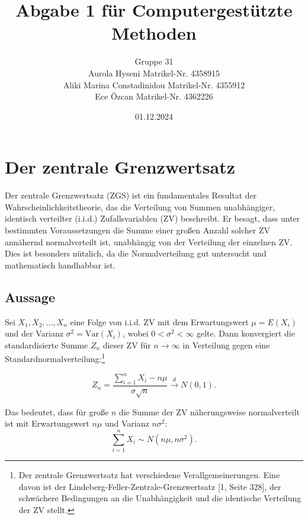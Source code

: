 \documentclass[a4paper,12pt]{article}
\begin{document}
\title{Abgabe 1 für Computergestützte Methoden}
\author{Gruppe 31\\ Aurola Hyseni  Matrikel-Nr. 4358915\\Aliki Marina Constadinidou  Matrikel-Nr. 4355912\\Ece Özcan  Matrikel-Nr. 4362226}
\date{01.12.2024}

\maketitle
\thispagestyle{empty}

\newpage
\thispagestyle{empty}
\tableofcontents



\newpage
\section{Der zentrale Grenzwertsatz}

Der zentrale Grenzwertsatz (ZGS) ist ein fundamentales Resultat der Wahrscheinlichkeitstheorie, das die Verteilung von Summen unabhängiger, identisch verteilter (i.i.d.) Zufallsvariablen (ZV) beschreibt. Er besagt, dass unter bestimmten Voraussetzungen die Summe einer großen Anzahl solcher ZV annähernd normalverteilt ist, unabhängig von der Verteilung der einzelnen ZV. Dies ist besonders nützlich, da die Normalverteilung gut untersucht und mathematisch handhabbar ist.

\subsection{Aussage}
Sei $X_1, X_2, \ldots, X_n$ eine Folge von i.i.d. ZV mit dem Erwartungswert $\mu = E(X_i)$ und der Varianz $\sigma^2 = \text{Var}(X_i)$, wobei $0 < \sigma^2 < \infty$ gelte. Dann konvergiert die standardisierte Summe $Z_n$ dieser ZV für $n \to \infty$ in Verteilung gegen eine Standardnormalverteilung:\footnote{Der zentrale Grenzwertsatz hat verschiedene Verallgemeinerungen. Eine davon ist der Lindeberg-Feller-Zentrale-Grenzwertsatz [1, Seite 328], der schwächere Bedingungen an die Unabhängigkeit und die identische Verteilung der ZV stellt.}


 \[
Z_n = \frac{\sum_{i=1}^n X_i - n\mu}{\sigma\sqrt{n}} \xrightarrow{d} N(0,1).  \]      



Das bedeutet, dass für große $n$ die Summe der ZV näherungsweise normalverteilt ist mit Erwartungswert $n\mu$ und Varianz $n\sigma^2$:
\[
\sum_{i=1}^n X_i \sim N(n\mu, n\sigma^2).
\]
\end{document}
